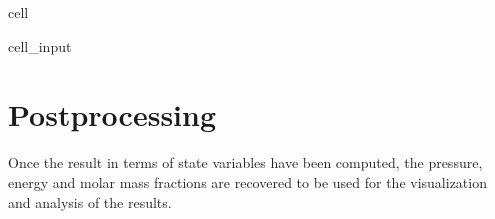 \documentclass[letterpaper,10pt,english]{jupyterBook}
\begin{document}
\begin{sphinxuseclass}{cell}
\begin{sphinxVerbatimInput}
\begin{sphinxuseclass}{cell_input}
\begin{sphinxVerbatim}[commandchars=\\\{\}]
      
      
    
  
\end{sphinxVerbatim}

\end{sphinxuseclass}\end{sphinxVerbatimInput}

\end{sphinxuseclass}

\section{Post\sphinxhyphen{}processing}
\label{\detokenize{1_Temperature/Problem_class_definition:post-processing}}
\sphinxAtStartPar
Once the result in terms of state variables have been computed, the pressure, energy and molar mass fractions are recovered to be used for the visualization and analysis of the results.
\end{document}
